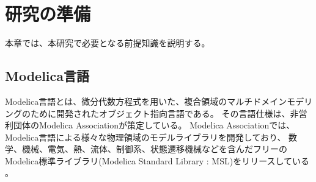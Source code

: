 \chapter{研究の準備}\label{cha:Preparation}
  \vspace{-2zh}
本章では、本研究で必要となる前提知識を説明する。
  \vspace{-1zh}
\section{Modelica言語}\label{modelica}
Modelica言語とは、微分代数方程式を用いた、複合領域のマルチドメインモデリングのために開発されたオブジェクト指向言語である\cite{modelicaモデルベース本}。
その言語仕様は、非営利団体のModelica Associationが策定している。
Modelica Associationでは、Modelica言語による様々な物理領域のモデルライブラリを開発しており、
数学、機械、電気、熱、流体、制御系、状態遷移機械などを含んだフリーのModelica標準ライブラリ(Modelica Standard Library : MSL)をリリースしている
\cite{modelicaモデルベース本}。
  \vspace{-1zh}
